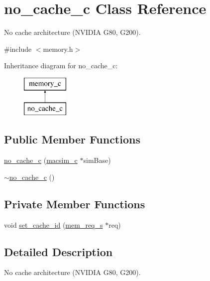 \hypertarget{classno__cache__c}{
\section{no\_\-cache\_\-c Class Reference}
\label{classno__cache__c}
}


No cache architecture (NVIDIA G80, G200).  




{\ttfamily \#include $<$memory.h$>$}

Inheritance diagram for no\_\-cache\_\-c:\begin{figure}[H]
\begin{center}
\leavevmode
\includegraphics[height=2.000000cm]{classno__cache__c}
\end{center}
\end{figure}
\subsection*{Public Member Functions}
\begin{DoxyCompactItemize}
\item 
\hyperlink{classno__cache__c_a7326f78042de36c2d9436e9c481e5ec4}{no\_\-cache\_\-c} (\hyperlink{classmacsim__c}{macsim\_\-c} $\ast$simBase)
\item 
\hyperlink{classno__cache__c_aa6183a0375f657e152232a90879421c4}{$\sim$no\_\-cache\_\-c} ()
\end{DoxyCompactItemize}
\subsection*{Private Member Functions}
\begin{DoxyCompactItemize}
\item 
void \hyperlink{classno__cache__c_aec1175eba0781322b067d5fa906391ed}{set\_\-cache\_\-id} (\hyperlink{structmem__req__s}{mem\_\-req\_\-s} $\ast$req)
\end{DoxyCompactItemize}


\subsection{Detailed Description}
No cache architecture (NVIDIA G80, G200). 

